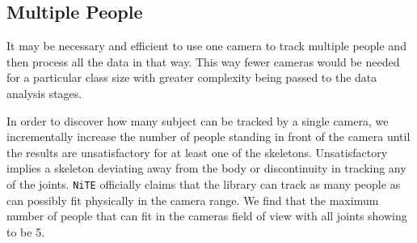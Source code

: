 \documentclass[10pt,a4paper]{article}
\begin{document}
\subsection{Multiple People}
\noindent
It may be necessary and efficient to use one camera to track multiple people and then process all the data in that way. This way fewer cameras would be needed for a particular class size with greater complexity being passed to the data analysis stages. 
 
\noindent
In order to discover how many subject can be tracked by a single camera, we incrementally increase the number of people standing in front of the camera until the results are unsatisfactory for at least one of the skeletons. Unsatisfactory implies a skeleton deviating away from the body or discontinuity in tracking any of the joints. \texttt{NiTE} officially claims that the library can track as many people as can possibly fit physically in the camera range. We find that the maximum number of people that can fit in the cameras field of view with all joints showing to be 5. 
 
\end{document}
